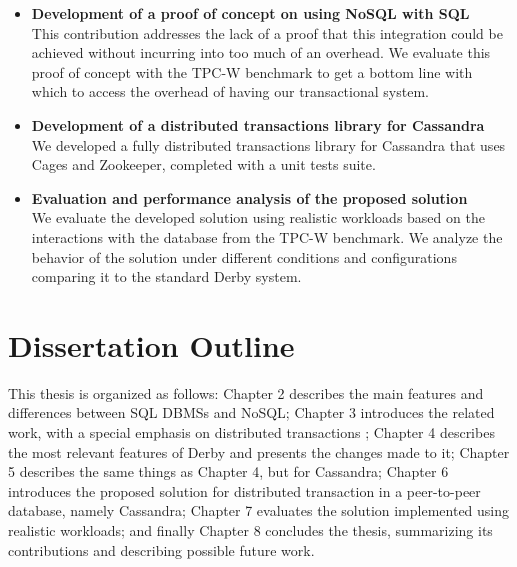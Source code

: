 \begin{itemize}
	\item \textbf{Development of a proof of concept on using NoSQL with SQL}\\
		This contribution addresses the lack of a proof that this integration could be achieved without incurring into too much of an overhead. We evaluate this proof of concept with the TPC-W benchmark\cite{tpcw} to get a bottom line with which to access the overhead of having our transactional system. 
		
	\item \textbf{Development of a distributed transactions library for Cassandra}\\
		We developed a fully distributed transactions library for Cassandra that uses Cages and Zookeeper, completed with a unit tests suite.
		
	\item \textbf{Evaluation and performance analysis of the proposed solution}\\
		We evaluate the developed solution using realistic workloads based on the interactions with the database from the TPC-W benchmark\cite{tpcw}. We analyze the behavior of the solution under different conditions and configurations comparing it to the standard Derby system.
\end{itemize}


\section{Dissertation Outline}

This thesis is organized as follows: Chapter 2 describes the main features and differences between SQL DBMSs and NoSQL; Chapter 3 introduces the related work, with a special emphasis on distributed transactions ; Chapter 4 describes the most relevant features of Derby and presents the changes made to it; Chapter 5 describes the same things as Chapter 4, but for Cassandra; Chapter 6 introduces the proposed solution for distributed transaction in a peer-to-peer database, namely Cassandra; Chapter 7 evaluates the solution implemented using realistic workloads; and finally Chapter 8 concludes the thesis, summarizing its contributions and describing possible future work. 



